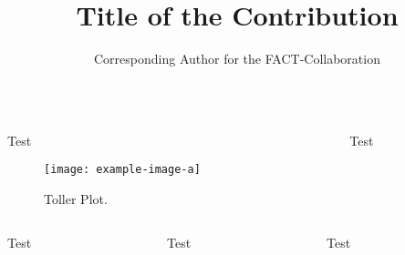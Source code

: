 \documentclass[t]{beamer}
\title{Title of the Contribution}
\author{Corresponding Author for the FACT-Collaboration}
\newlength{\thirdtextwidth}
\begin{document}
%
\begin{columns}[onlytextwidth]%
  \begin{column}{\textwidth}%
    \begin{block}
      \blindtext[2]
    \end{block}
  \end{column}%
\end{columns}%
\begin{columns}[onlytextwidth]%
  \begin{column}{0.5\textwidth}%
    \begin{block}[equal height group=A]{Test}%
      \begin{multicols}{2}
        \begin{figure}
          \texttt{[image: example-image-a]}\\
          \caption{Toller Plot.\cite{fact-performance}}\label{fig:tollerplot}
        \end{figure}
        \columnbreak
        \blindtext
      \end{multicols}
    \end{block}%
  \end{column}%
  \begin{column}{0.5\textwidth}%
    \begin{alertblock}[equal height group=A]{Test}%
      \begin{multicols}{2}
        \blindtext\cite{fact-reference}
        \blindtext 
      \end{multicols}
    \end{alertblock}%
  \end{column}%
\end{columns}%
\begin{columns}[c, onlytextwidth]%
  \begin{column}{\thirdtextwidth}%
    \begin{exampleblock}{Test}%
      \blindtext%
    \end{exampleblock}%
  \end{column}%
  \begin{column}{\thirdtextwidth}%
    \begin{block}{Test}%
      \blindtext%
    \end{block}%
  \end{column}%
  \begin{column}{\thirdtextwidth}%
    \begin{block}{Test}%
      \blindtext%
    \end{block}%
  \end{column}%
\end{columns}%
\end{document}
